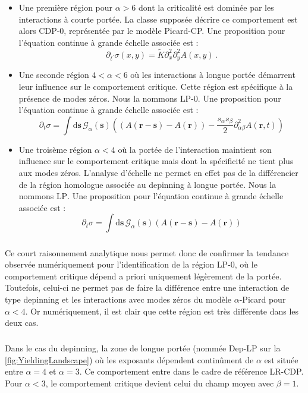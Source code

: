 \begin{itemize}
	\item Une première région pour $\alpha>6$ dont la criticalité est dominée par les interactions à courte portée. La classe supposée décrire ce comportement est alors CDP-0, représentée par le modèle Picard-CP. Une proposition pour l'équation continue à grande échelle associée est :
\begin{equation}
	    \partial_{t^\prime}\sigma (x,y) = \tilde{K}\partial_x^{2}\partial_y^{2}A(x, y)\, .
\end{equation}
	\item Une seconde région $4<\alpha<6$ où les interactions à longue portée démarrent leur influence sur le comportement critique. Cette région est spécifique à la présence de modes zéros. Nous la nommons $\text{LP-0}$. Une proposition pour l'équation continue à grande échelle associée est : 
\begin{equation}
    \partial_t \sigma = 
    \int \mathrm{d}\bm{s}\, \mathcal{G}_\alpha(\bm{s}) \left(  \left( A(\mathbf{r}-\mathbf{s})-A(\mathbf{r})\right) - \frac{s_\alpha s_\beta}{2}\partial^2_{\alpha\beta} A(\bm{r}, t)\right)
\end{equation}
	\item Une troisème région $\alpha <4$ où la portée de l'interaction maintient son influence sur le comportement critique mais dont la spécificité ne tient plus aux modes zéros. L'analyse d'échelle ne permet en effet pas de la différencier de la région homologue associée au depinning à longue portée. Nous la nommons $\text{LP}$. Une proposition pour l'équation continue à grande échelle associée est :
	\begin{equation}
    \partial_t \sigma = 
    \int \mathrm{d}\bm{s}\, \mathcal{G}_\alpha(\bm{s}) \left( A(\mathbf{r}-\mathbf{s})-A(\mathbf{r})\right)
\end{equation}
\end{itemize}

\subparagraph{}Ce court raisonnement analytique nous permet donc de confirmer la tendance observée numériquement pour l'identification de la région LP-0, où le comportement critique dépend a priori uniquement légèrement de la portée. Toutefois, celui-ci ne permet pas de faire la différence entre une interaction de type depinning et les interactions avec modes zéros du modèle $\alpha$-Picard pour $\alpha<4$. Or numériquement, il est clair que cette région est très différente dans les deux cas.

\subparagraph{}Dans le cas du depinning, la zone de longue portée (nommée Dep-LP sur la \autoref{fig:YieldingLandscape}) où les exposants dépendent continûment de $\alpha$ est située entre $\alpha=4$ et $\alpha=3$. Ce comportement entre dans le cadre de référence LR-CDP. Pour $\alpha<3$, le comportement critique devient celui du champ moyen avec $\beta=1$.

